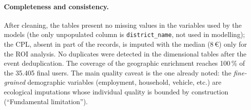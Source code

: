 \paragraph{Completeness and consistency.} After cleaning, the tables present no missing values in the variables used by the models (the only unpopulated column is \texttt{district\_name}, not used in modelling); the CPL, absent in part of the records, is imputed with the median (8\,\euro) only for the ROI analysis. No duplicates were detected in the dimensional tables after the event deduplication. The coverage of the geographic enrichment reaches 100\,\% of the 35.405 final users. The main quality caveat is the one already noted: the \emph{fine-grained} demographic variables (employment, household, vehicle, etc.) are ecological imputations whose individual quality is bounded by construction (``Fundamental limitation'').
